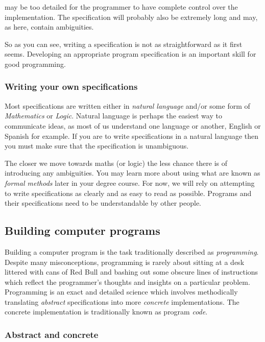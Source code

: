 may be too detailed for the programmer to have complete control over the 
implementation. The specification will probably also be extremely long and 
may, as here, contain ambiguities. 

So as you can see, writing a specification is not as straightforward as it 
first seems. Developing an appropriate program specification is an
important skill for good programming.

\subsubsection{Writing your own specifications} 

Most specifications are written either in {\em natural
language} and/or some form of {\em Mathematics} or {\em Logic}.
Natural language is perhaps the easiest way to communicate ideas, as
most of  us understand one language or another, English or Spanish for
example. If you are to  
write specifications in a natural language then you must make sure that the
specification is unambiguous. 

The closer we move towards 
maths (or logic) the less chance there is of introducing any ambiguities. 
You may learn more about using what
are known as {\em formal methods} later in your degree course.
For now, we will rely on attempting to write specifications as clearly
and as easy to read as possible. Programs and their specifications
need to be understandable by other people.

\subsection{Building computer programs}

Building a computer program is the task traditionally described
as {\em programming}. 
Despite many misconceptions, programming is rarely about sitting at a
desk littered with cans of Red Bull and bashing out some obscure lines
of instructions which reflect the programmer's thoughts and insights on a
particular problem. Programming is an exact and detailed science which
involves methodically translating {\em abstract}  
specifications
into more {\em concrete} implementations. The concrete implementation
is traditionally known as program {\em code}. 

\subsubsection{Abstract and concrete}

